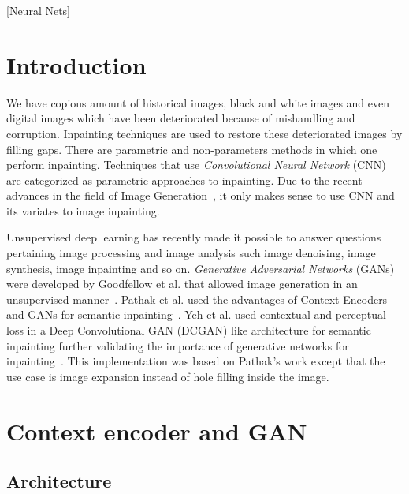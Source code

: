 \documentclass{sig-alternate}
\begin{document}
[Neural Nets]



\section{Introduction}
We have copious amount of historical images, black and white images and even digital images which have been deteriorated because of mishandling and corruption. Inpainting techniques are used to restore these deteriorated images by filling gaps. There are parametric and non-parameters methods in which one perform inpainting. Techniques that use \textit{Convolutional Neural Network} (CNN) are categorized as parametric approaches to inpainting. Due to the recent advances in the field of Image Generation~\cite{doersch2015unsupervised}, it only makes sense to use CNN and its variates to image inpainting.

Unsupervised deep learning has recently made it possible to answer questions pertaining image processing and image analysis such image denoising, image synthesis, image inpainting and so on. \textit{Generative Adversarial Networks} (GANs) were developed by Goodfellow et al. that allowed image generation in an unsupervised manner~\cite{goodfellow2014:generative}. Pathak et al. used the advantages of Context Encoders and GANs for semantic inpainting~\cite{pathak2016context}. Yeh et al. used contextual and perceptual loss in a Deep Convolutional GAN (DCGAN) like architecture for semantic inpainting further validating the importance of generative networks for inpainting~\cite{yeh2016:semantic}. This implementation was based on Pathak's work except that the use case is image expansion instead of hole filling inside the image.

\section{Context encoder and GAN}

\subsection{Architecture}
\end{document}
